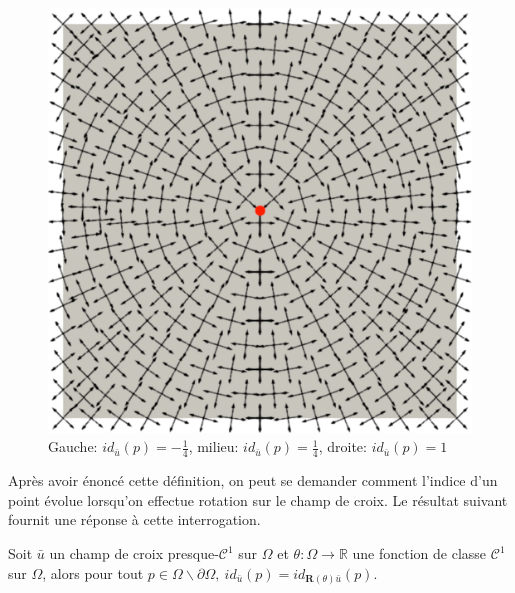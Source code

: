 \begin{figure}[!h]
  \includegraphics[scale=0.25]{images/index_1.pdf}
  \caption{Gauche: $id_{\bar{u}}(p)=-\frac{1}{4}$, milieu: $id_{\bar{u}}(p)=\frac{1}{4}$, droite: $id_{\bar{u}}(p)=1$}
  \label{fig:index_illustration}
\end{figure}

Après avoir énoncé cette définition, on peut se demander comment l'indice d'un point évolue lorsqu'on effectue rotation sur le champ de croix. Le résultat suivant fournit une réponse à cette interrogation.

\begin{proposition}
\label{prop:relation_u_Rthetau}
Soit $\bar{u}$ un champ de croix presque-$\mathcal{C}^1$ sur $\Omega$ et $\theta:\Omega \rightarrow \mathbb{R}$ une fonction de classe $\mathcal{C}^1$ sur $\Omega$, alors pour tout $p\in \Omega\backslash\partial\Omega,~id_{\bar{u}}(p)=id_{\mathbf{R}(\theta)\bar{u}}(p)$.
\end{proposition}

